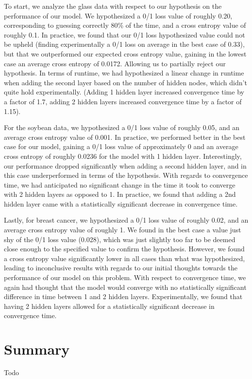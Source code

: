 \documentclass[twoside,11pt]{article}
\begin{document}
To start, we analyze the glass data with respect to our hypothesis on the performance of our model. We hypothesized a 0/1 loss value of roughly 0.20, corresponding
to guessing correctly 80\% of the time, and a cross entropy value of roughly 0.1. In practice, we found that our 0/1 loss hypothesized value could not be upheld (finding
experimentally a 0/1 loss on average in the best case of 0.33),
but that we outperformed our expected cross entropy value, gaining in the lowest case an average cross entropy of 0.0172. Allowing us to partially reject our
hypothesis. In terms of runtime,
we had hypothesized a linear change in runtime when adding the second layer based on the number of hidden nodes, which didn't quite hold experimentally.
(Adding 1 hidden layer increased convergence time by a factor of 1.7, adding 2 hidden layers increased convergence time by a factor of 1.15).



For the soybean data, we hypothesized a 0/1 loss value of roughly 0.05, and an average cross entropy value of 0.001. In practice, we performed 
better in the best case for our model,
gaining a 0/1 loss value of approximately 0 and an average cross entropy of roughly 0.0236 for the model with 1 hidden layer. Interestingly, our
performance dropped significantly when adding a second hidden layer, and in this case underperformed in terms of the hypothesis. With regards to
convergence time, we had anticipated no significant change in the time it took to converge with 2 hidden layers as opposed to 1. In practice, we
found that adding a 2nd hidden layer came with a statistically significant decrease in convergence time.

Lastly, for breast cancer, we hypothesized a 0/1 loss value of roughly 0.02, and an average cross entropy value of roughly 1. We found in the best case a value
just shy of the 0/1 loss value (0.028), which was just slightly too far to be deemed close enough to the specified value to confirm the hypothesis. However,
we found a cross entropy value significantly lower in all cases than what was hypothesized, leading to inconclusive results with regards
to our initial thoughts towards the performance of our model on this problem. With respect to convergence time, we again had thought that the model would converge
with no statistically significant difference in time between 1 and 2 hidden layers. Experimentally, we found that having 2 hidden layers allowed for a statistically
significant decrease in convergence time.

\section{Summary}
Todo
\end{document}
